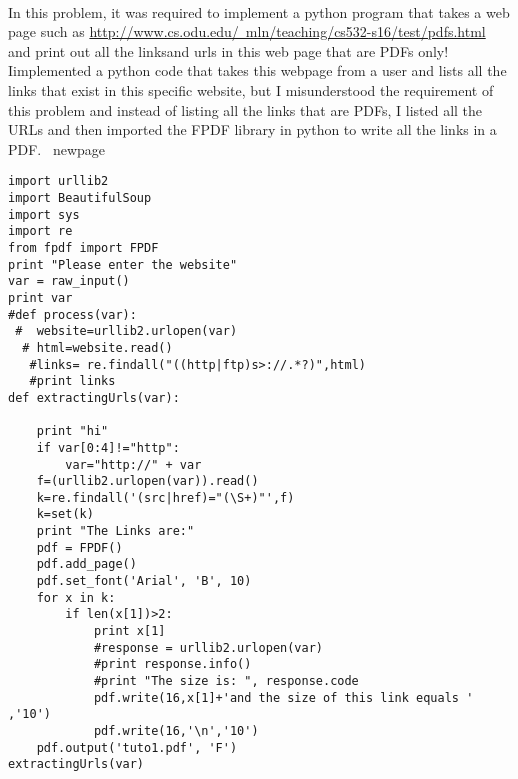 \documentclass{article}
\begin{document}
\paragraph{}
In this problem, it was required to implement a python program that takes a web page such as \href{url}{http://www.cs.odu.edu/~mln/teaching/cs532-s16/test/pdfs.html} and print out all the linksand urls in this web page that are PDFs only!
Iimplemented a python code that takes this webpage from a user and lists all the links that exist in this specific website, but I misunderstood the requirement of this problem and instead of listing all the links that are PDFs, I listed all the URLs and then imported the FPDF library in python to write all the links in a PDF.
\ newpage
\begin{lstlisting}
import urllib2
import BeautifulSoup
import sys
import re
from fpdf import FPDF
print "Please enter the website"
var = raw_input()
print var
#def process(var):
 #  website=urllib2.urlopen(var)
  # html=website.read()
   #links= re.findall("((http|ftp)s>://.*?)",html)
   #print links
def extractingUrls(var):
	
    print "hi"
    if var[0:4]!="http":
        var="http://" + var
    f=(urllib2.urlopen(var)).read()
    k=re.findall('(src|href)="(\S+)"',f)	
    k=set(k)
    print "The Links are:"
    pdf = FPDF()
    pdf.add_page()
    pdf.set_font('Arial', 'B', 10)	
    for x in k:
        if len(x[1])>2:
            print x[1]
            #response = urllib2.urlopen(var)
            #print response.info()
            #print "The size is: ", response.code
            pdf.write(16,x[1]+'and the size of this link equals ' ,'10')
            pdf.write(16,'\n','10')
    pdf.output('tuto1.pdf', 'F')			
extractingUrls(var)
\end{lstlisting}
\end{document}
